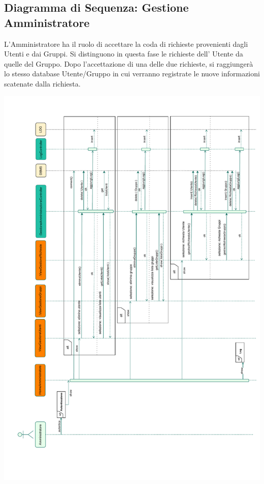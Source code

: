 \vspace{2cm}
\subsection*{Diagramma di Sequenza: Gestione Amministratore}
{}
L'Amministratore ha il ruolo di accettare la coda di richieste provenienti dagli Utenti e dai Gruppi. Si distinguono in questa fase le richieste dell' Utente da quelle del Gruppo. Dopo l'accettazione di una delle due richieste, si raggiungerà lo stesso database Utente/Gruppo in cui verranno registrate le nuove informazioni scatenate dalla richiesta.
\begin{adjustwidth}{-2cm}{0cm}
\includegraphics[scale=0.7]{progettazione/Diagramma-Sequenza-Interazione-GestioneAmministratore.drawio.pdf}
\end{adjustwidth}
\vspace{0.5cm}


